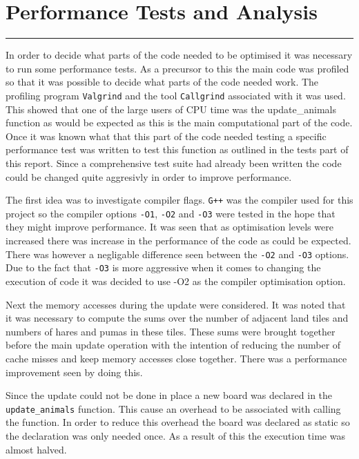 \section{Performance Tests and Analysis}
\vspace{-2em}\rule{\textwidth}{1pt}\vspace{1em}

In order to decide what parts of the code needed to be optimised it was necessary to run some performance tests.
As a precursor to this the main code was profiled so that it was possible to decide what parts of the code needed work.
The profiling program \texttt{Valgrind} and the tool \texttt{Callgrind} associated with it was used.
This showed that one of the large users of CPU time was the update\_animals function as would be expected as this is the main computational part of the code.
Once it was known what that this part of the code needed testing a specific performance test was written to test this function as outlined in the tests part of this report.
Since a comprehensive test suite had already been written the code could be changed quite aggresivly in order to improve performance.

The first idea was to investigate compiler flags.
\texttt{G++} was the compiler used for this project so the compiler options \texttt{-O1}, \texttt{-O2} and \texttt{-O3} were tested in the hope that they might improve performance.
It was seen that as optimisation levels were increased there was increase in the performance of the code as could be expected.
There was however a negligable difference seen between the \texttt{-O2} and \texttt{-O3} options.
Due to the fact that \texttt{-O3} is more aggressive when it comes to changing the execution of code it was decided to use -O2 as the compiler optimisation option.

Next the memory accesses during the update were considered.
It was noted that it was necessary to compute the sums over the number of adjacent land tiles and numbers of hares and pumas in these tiles.
These sums were brought together before the main update operation with the intention of reducing the number of cache misses and keep memory accesses close together.
There was a performance improvement seen by doing this.

Since the update could not be done in place a new board was declared in the \texttt{update\_animals} function.
This cause an overhead to be associated with calling the function.
In order to reduce this overhead the board was declared as static so the declaration was only needed once.
As a result of this the execution time was almost halved.

